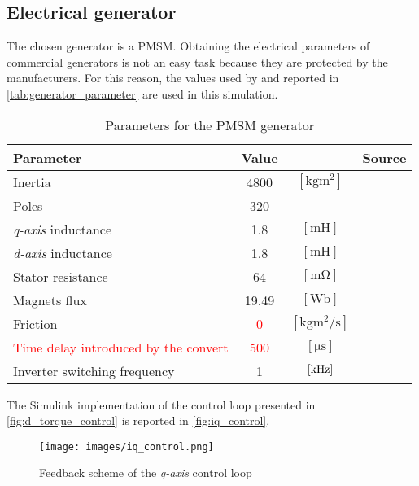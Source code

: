 \subsection{Electrical generator}
The chosen generator is a \acrshort{PMSM}. Obtaining the electrical parameters of commercial generators is not an easy task because they are protected by the manufacturers. For this reason, the values used by \cite{10-MW_Direct-Drive_PMSG-Based_Wind_Energy_Conversion_System_Model} and reported in \autoref{tab:generator_parameter} are used in this simulation.
\begin{table}[htb]
    \caption{Parameters for the \acrlong{PMSM} generator}
    \centering
    \begin{tabular}{lccc}
    \toprule
    Parameter & Value & & Source\\ \midrule
    Inertia & 4800 & $\left[\si{\kilo\gram\square\meter}\right]$ & \cite{the_switch_datasheet} \\\midrule	
    Poles & 320 & & \multirow{5}{*}{\cite{10-MW_Direct-Drive_PMSG-Based_Wind_Energy_Conversion_System_Model}} \\
    \textit{q-axis} inductance & 1.8 & $\left[\si{\milli\henry}\right]$ & \\
    \textit{d-axis} inductance & 1.8 & $\left[\si{\milli\henry}\right]$ &\\
    Stator resistance & 64 & $\left[\si{\milli\ohm}\right]$ &\\
    Magnets flux & 19.49 & $\left[\si{\weber}\right]$ &\\ \midrule
    Friction & \textcolor{red}{0} & $\left[\si{\kilo\gram\square\meter\per\second}\right]$ & \\
    \textcolor{red}{Time delay introduced by the convert} & \textcolor{red}{500} & $\left[\si{\micro\second}\right]$ & \\
    Inverter switching frequency & 1 & $\left[\si{\kilo\hertz}\right]$ & \\
    \bottomrule
    \end{tabular}
    \label{tab:generator_parameter}
\end{table}

The Simulink implementation of the control loop presented in \autoref{fig:d_torque_control} is reported in \autoref{fig:iq_control}.
\begin{figure}[htb]
   \centering
   \texttt{[image: images/iq\_control.png]}
   \caption{Feedback scheme of the \textit{q-axis} control loop}
   \label{fig:iq_control}
\end{figure}

